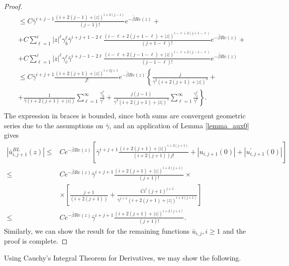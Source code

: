 \documentclass[12pt]{article}
\begin{document}
\begin{proof}
$$\begin{aligned}
& \leq C \bar{\gamma}^{i+j-1} \frac{(i+2(j-1)+|z|)^{i+2(j-1)}}{(j-1)!} e^{-\bar{\beta} R e(z)}+ \\
& +C \sum_{\ell=1}^i|z|^{\ell} \gamma_{\bar{b}}^{\ell} \bar{\gamma}^{i+j+1-2 \ell} \frac{(i-\ell+2(j+1-\ell)+|z|)^{i-\ell+2(j+1-\ell)}}{(j+1-\ell)!} e^{-\bar{\beta} R e(z)}+ \\
& +C \sum_{\ell=1}^i|z|^{\ell} \gamma_{\bar{c}}^{\ell} \bar{\gamma}^{i+j-1-2 \ell} \frac{(i-\ell+2(j-1-\ell)+|z|)^{i-\ell+2(j-1-\ell)}}{(j-1-\ell)!} e^{-\bar{\beta} R e(z)} \\
& \leq C \bar{\gamma}^{i+j+1} \frac{(i+2(j+1)+|z|)^{i+2 j+1}}{j!} e^{-\bar{\beta} R e(z)}\left\{\frac{j}{\bar{\gamma}^2(i+2(j+1)+|z|)^3}+\right. \\
& \left.+\frac{1}{\bar{\gamma}(i+2(j+1)+|z|)} \sum_{\ell=1}^{\infty} \frac{\gamma_{\bar{b}}^{\ell}}{\bar{\gamma}^{\ell}}+\frac{j(j-1)}{\bar{\gamma}^3(i+2(j+1)+|z|)^5} \sum_{\ell=1}^{\infty} \frac{\gamma_{\bar{c}}^{\ell}}{\bar{\gamma}^{\ell}}\right\} . \\
&
\end{aligned}
$$
%
The expression in braces is bounded, since both sums are convergent geometric series due to the assumptions on $\bar{\gamma}$, and an application of Lemma \ref{lemma_aux0} gives
%
$$
\begin{aligned}
\left|\bar{u}_{i, j+1}^{B L}(z)\right| \leq & C e^{-\bar{\beta} R e(z)}\left[\bar{\gamma}^{i+j+1} \frac{(i+2(j+1)+|z|)^{i+2(j+1)}}{(i+2(j+1)) j!}+\left|u_{i, j+1}(0)\right|+\left|u_{i, j+1}^{\prime}(0)\right|\right] \\
\leq & C e^{-\bar{\beta} R e(z)} \bar{\gamma}^{i+j+1} \frac{(i+2(j+1)+|z|)^{i+2(j+1)}}{(j+1)!} \times \\
& \times\left[\frac{j+1}{(i+2(j+1))}+\frac{\bar{C} i^i(j+1)^{j+1}}{\bar{\gamma}^{j+1}(i+2(j+1)+|z|)^{i+2(j+1)}}\right] \\
\leq & C e^{-\bar{\beta} R e(z)} \bar{\gamma}^{i+j+1} \frac{(i+2(j+1)+|z|)^{i+2(j+1)}}{(j+1)!} .
\end{aligned}
$$
%
Similarly, we can show the result for the remaining functions $\bar{u}_{i,j},i \geq 1$ and the proof is complete.
\end{proof}

Using Cauchy's Integral Theorem for Derivatives, we may show the following.
\end{document}

